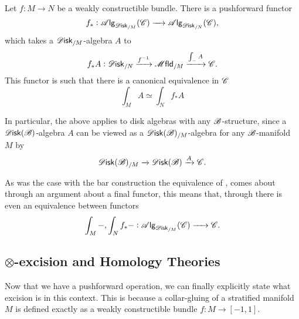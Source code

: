 \documentclass[../text]{subfiles}
\begin{document}
\begin{theorem}\label{thm:fh_pushforward}
    Let $f: M \xrightarrow{} N$ be a weakly constructible bundle. There is a pushforward functor
    \begin{equation}
        f_*: \alg{\disk_{/M}}(\catC) \xrightarrow{\quad} \alg{\disk_{/N}}(\catC),
    \end{equation}
    which takes a $\disk_{/M}$-algebra $A$ to
    \begin{equation}
        f_*A: \disk_{/N} \xrightarrow{f^{-1}} \mfld_{/M} \xrightarrow{\int_{-} A} \catC.
    \end{equation}
    This functor is such that there is a canonical equivalence in $\mathscr{C}$
    \begin{equation}
        \int_{M} A \simeq \int_{N} f_* A
    \end{equation}
\end{theorem}


\begin{remark}
    In particular, the above applies to disk algebras with any $\mathscr{B}$-structure, since a $\disk(\bstr)$-algebra $A$ can be viewed as a $\disk(\bstr)_{/M}$-algebra for any $\mathscr{B}$-manifold $M$ by
    \begin{equation}
        \disk(\bstr)_{/M} \xrightarrow{} \disk(\bstr) \xrightarrow{A} \catC.
    \end{equation}
\end{remark}

\begin{remark}\label{rem:fh_pushforward_functorial}
    As was the case with the bar construction the equivalence of , comes about through an argument about a final functor, this means that, through  there is even an equivalence between functors
    \begin{equation}
        \int_M -, \int_N f_* - : \alg{\disk_{/M}} (\catC) \xrightarrow{\ \ \ \ } \catC.
    \end{equation}
\end{remark}




\subsection{\texorpdfstring{$\otimes$}{tensor}-excision and Homology Theories}\label{sec:excision_homology}

Now that we have a pushforward operation, we can finally explicitly state what excision is in this context. This is because a collar-gluing of a stratified manifold $M$ is defined exactly as a weakly constructible bundle $f: M \xrightarrow{} [-1,1]$.
\end{document}

